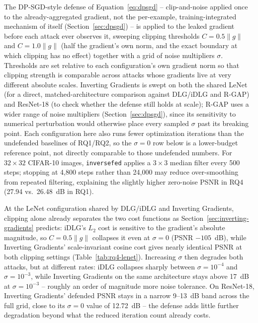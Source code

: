 \begingroup
\setlength{\emergencystretch}{2em}
The DP-SGD-style defense of Equation~\eqref{eq:dpsgd} -- clip-and-noise applied once to
the already-aggregated gradient, not the per-example, training-integrated mechanism of
\cite{abadi2016dpsgd} itself (Section~\ref{sec:dpsgd}) -- is applied to the leaked
gradient before each attack ever observes it, sweeping clipping thresholds $C = 0.5\lVert
g\rVert$ and $C = 1.0\lVert g\rVert$ (half the gradient's own norm, and the exact
boundary at which clipping has no effect) together with a grid of noise multipliers
$\sigma$. Thresholds are set relative to each configuration's own gradient norm so
that clipping strength is comparable across attacks whose gradients live at very
different absolute scales. Inverting Gradients is swept on both the shared LeNet
(for a direct, matched-architecture comparison against DLG/iDLG and R-GAP) and
ResNet-18 (to check whether the defense still holds at scale); R-GAP uses a wider
range of noise multipliers (Section~\ref{sec:dpsgd}), since its sensitivity to
numerical perturbation would otherwise place every sampled $\sigma$ past its
breaking point. Each configuration here also runs fewer optimization iterations
than the undefended baselines of RQ1/RQ2, so the $\sigma=0$ row below is a
lower-budget reference point, not directly comparable to those undefended numbers.
For $32\times32$ CIFAR-10 images, \texttt{inversefed} applies a $3\times3$ median filter every 500 steps; stopping at 4{,}800 steps rather than 24{,}000 may reduce over-smoothing from repeated filtering, explaining the slightly higher zero-noise PSNR in RQ4 (27.94 vs.\ 26.48~dB in RQ1).
\par\endgroup

At the LeNet configuration shared by DLG/iDLG and Inverting Gradients, clipping
alone already separates the two cost functions as Section~\ref{sec:inverting-gradients}
predicts: iDLG's $L_2$ cost is sensitive to the gradient's absolute magnitude, so
$C=0.5\lVert g\rVert$ collapses it even at $\sigma=0$ (PSNR $-105$~dB), while
Inverting Gradients' scale-invariant cosine cost gives nearly identical PSNR at
both clipping settings (Table~\ref{tab:rq4-lenet}). Increasing $\sigma$ then
degrades both attacks, but at different rates: iDLG collapses sharply between
$\sigma=10^{-4}$ and $\sigma=10^{-3}$, while Inverting Gradients on the same
architecture stays above 17~dB at $\sigma=10^{-3}$ -- roughly an order of
magnitude more noise tolerance. On ResNet-18, Inverting Gradients' defended PSNR
stays in a narrow 9--13~dB band across the full grid, close to its $\sigma=0$
value of 12.72~dB -- the defense adds little further degradation beyond what the
reduced iteration count already costs.

